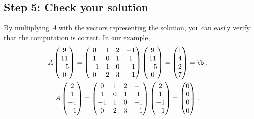 \subsection*{Step 5: Check your solution}

By multiplying $A$ with the vectors representing the solution, you can
easily verify that the computation is correct.  In our example,
\begin{gather*}
  A \begin{pmatrix}
    9 \\ 11 \\ -5 \\ 0
  \end{pmatrix}
  =
  \begin{pmatrix}
  0 & 1 & 2 & -1 \\
  1 & 0 & 1 & 1 \\
  -1 & 1 & 0 & -1 \\
  0 & 2 & 3 & -1
  \end{pmatrix}
  \begin{pmatrix}
    9 \\ 11 \\ -5 \\ 0
  \end{pmatrix}
  = \begin{pmatrix}
  1 \\ 4 \\ 2 \\ 7 
  \end{pmatrix} =\b \,, \\
  A \begin{pmatrix}
  2 \\ 1 \\ -1 \\ -1
  \end{pmatrix}
  =
  \begin{pmatrix}
  0 & 1 & 2 & -1 \\
  1 & 0 & 1 & 1 \\
  -1 & 1 & 0 & -1 \\
  0 & 2 & 3 & -1
  \end{pmatrix}
  \begin{pmatrix}
  2 \\ 1 \\ -1 \\ -1
  \end{pmatrix}
  =
  \begin{pmatrix}
  0\\0\\0\\0
  \end{pmatrix} \,.  
\end{gather*}

